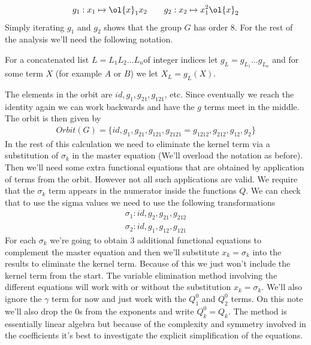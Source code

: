 \begin{align}
	g_1: x_1 \mapsto \ol{x}_1x_2\quad\quad g_2: x_2 \mapsto x_1^2 \ol{x}_2
\end{align}
Simply iterating $g_1$ and $g_2$  shows that the group $G$ has order 8. For the rest of the analysis we'll need the following notation.
\begin{definition} For a concatenated list $L = L_1L_2\ldots L_n$of integer indices let $g_L = g_{L_1}\ldots g_{L_n}$ and for some term $X$ (for example $A$ or $B$) we let $X_L = g_L(X)$.
\end{definition}
The elements in the orbit are $id, g_1,g_{21},g_{121}$, etc. Since eventually we reach the identity again we can work backwards and have the $g$ terms meet in the middle. The orbit is then given by
\begin{align}
	Orbit(G) = \{id, g_1, g_{21},g_{121},g_{2121}=g_{1212}, g_{212},g_{12},g_{2}\}
\end{align}
In the rest of this calculation we need to eliminate the kernel term via a substitution of $\sigma_k$ in the master equation (We'll overload the notation as before). Then we'll need some extra functional equations that are obtained by application of terms from the orbit. However not all such applications are valid. We require that the $\sigma_k$ term appears in the numerator inside the functions $Q$. We can check that to use the sigma values we need to use the following transformations
\begin{align}
	\sigma_1: id, g_2, g_{21}, g_{212}\\
	\sigma_2: id, g_1, g_{12}, g_{121}
\end{align}
For each $\sigma_k$ we're going to obtain 3 additional functional equations to complement the master equation and then we'll substitute $x_k = \sigma_k$ into the results to eliminate the kernel term. Because of this we just won't include the kernel term from the start. The variable elimination method involving the different equations will work with or without the substitution $x_k = \sigma_k$. We'll also ignore the $\gamma$ term for now and just work with the $Q_1^0$ and $Q_2^0$ terms. On this note we'll also drop the 0s from the exponents and write $Q_k^0 = Q_k$. The method is essentially linear algebra but because of the complexity and symmetry involved in the coefficients it's best to investigate the explicit simplification of the equations.

